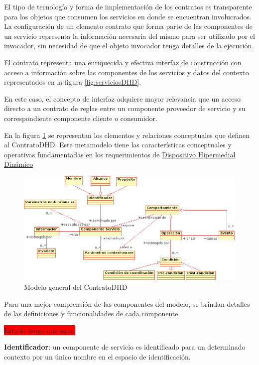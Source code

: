 \begin{itemize}
El tipo de tecnología y forma de implementación de los contratos es transparente para los objetos que consumen los servicios en donde se encuentran involucrados. La configuración de un elemento contrato que forma parte de las componentes de un servicio representa la información necesaria del mismo para ser utilizado por el invocador, sin necesidad de que el objeto invocador tenga detalles de la ejecución.

El contrato representa una enriquecida y efectiva interfaz de construcción con acceso a información sobre las componentes de los servicios y datos del contexto representados en la figura \ref{fig:serviciosDHD}.

En este caso, el concepto de interfaz adquiere mayor relevancia que un acceso directo a un contrato de reglas entre un componente proveedor de servicio y su correspondiente componente cliente o consumidor.

En la figura \ref{fig:contratodhd_modelo_general} se representan los elementos y relaciones conceptuales que definen al ContratoDHD. Este metamodelo tiene las características conceptuales y operativas fundamentadas en los requerimientos de  \hyperref[requerimientos_dhd]{Dispositivo Hipermedial Dinámico}

\begin{figure}
    \centering
    \includegraphics[width=0.9\linewidth]{Ch4/contratoca.png}
    \caption{Modelo general del ContratoDHD}
    \label{fig:contratodhd_modelo_general}
\end{figure}


Para una mejor comprensión de las componentes del modelo, se brindan detalles de las definiciones y funcionalidades de cada componente.



\colorbox{red}{Esto lo tengo que sacar}


\textbf{Identificador}: un componente de servicio es identificado para un determinado contexto por un único nombre en el espacio de identificación.


\end{itemize}
